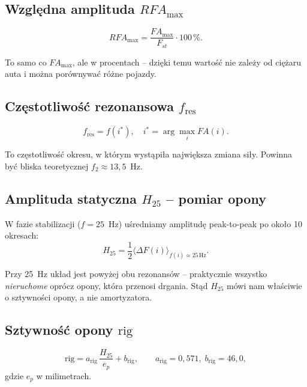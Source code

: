 \documentclass[11pt,a4paper]{article}
\theoremstyle{plainpol}
\begin{document}
\subsection{Względna amplituda $RFA_{\max}$}

\begin{equation}
  RFA_{\max} = \dfrac{FA_{\max}}{F_{st}}\cdot 100\,\%.
  \label{eq:rfa}
\end{equation}

To samo co $FA_{\max}$, ale w procentach -- dzięki temu wartość nie
zależy od ciężaru auta i można porównywać różne pojazdy.

\subsection{Częstotliwość rezonansowa $f_{\mathrm{res}}$}

\begin{equation}
  f_{\mathrm{res}} = f(i^*), \quad i^* = \arg\max_i FA(i).
\end{equation}

To częstotliwość okresu, w którym wystąpiła największa zmiana siły.
Powinna być bliska teoretycznej $f_2 \approx 13{,}5$~Hz.

\subsection{Amplituda statyczna $H_{25}$ -- pomiar opony}

W fazie stabilizacji ($f = 25$~Hz) uśredniamy amplitudę peak-to-peak
po około 10 okresach:
\begin{equation}
  H_{25} = \dfrac{1}{2}\bigl\langle \Delta F(i)\bigr\rangle_{f(i)\approx 25\,\mathrm{Hz}}.
\end{equation}

\begin{intuicja}
Przy 25~Hz układ jest powyżej obu rezonansów -- praktycznie wszystko
\emph{nieruchome} oprócz opony, która przenosi drgania. Stąd $H_{25}$
mówi nam właściwie o sztywności opony, a nie amortyzatora.
\end{intuicja}

\subsection{Sztywność opony $\mathrm{rig}$}

\begin{equation}
  \mathrm{rig} = a_{\mathrm{rig}}\,\dfrac{H_{25}}{e_p} + b_{\mathrm{rig}},\qquad
  a_{\mathrm{rig}} = 0{,}571,\; b_{\mathrm{rig}} = 46{,}0,
\end{equation}
gdzie $e_p$ w milimetrach.
\end{document}
